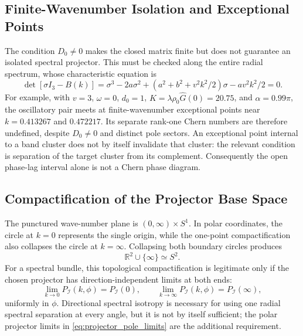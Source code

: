 \documentclass[11pt]{article}
\numberwithin{equation}{section}
\begin{document}
\subsection{Finite-Wavenumber Isolation and Exceptional Points}

The condition $D_0\ne0$ makes the closed matrix finite but does not guarantee
an isolated spectral projector. This must be checked along the entire radial
spectrum, whose characteristic equation is
\begin{equation}
 \det[\sigma I_3-B(k)]
 =\sigma^3-2a\sigma^2+
 (a^2+b^2+v^2k^2/2)\sigma-av^2k^2/2=0.
 \label{eq:radial_characteristic_polynomial}
\end{equation}
For example, with $v=3$, $\omega=0$, $d_0=1$,
$K=\lambda\rho_0\widehat G(0)=20.75$, and $\alpha=0.99\pi$, the oscillatory pair
meets at finite-wavenumber exceptional points near $k=0.413267$ and
$0.472217$. Its separate rank-one Chern numbers are therefore undefined,
despite $D_0\ne0$ and distinct pole sectors. An exceptional point internal
to a band cluster does not by itself invalidate that cluster: the relevant
condition is separation of the target cluster from its complement.
Consequently the open phase-lag interval alone is not a Chern phase diagram.

\subsection{Compactification of the Projector Base Space}

The punctured wave-number plane is $(0,\infty)\times S^1$. In polar
coordinates, the circle at $k=0$ represents the single origin, while the
one-point compactification also collapses the circle at $k=\infty$.
Collapsing both boundary circles produces
\begin{equation}
  \mathbb R^2\cup\{\infty\}\simeq S^2.
  \label{eq:wavenumber_compactification}
\end{equation}
For a spectral bundle, this topological compactification is legitimate
only if the chosen projector has direction-independent limits at both
ends:
\begin{equation}
  \lim_{k\to0}P_{\mathcal I}(k,\phi)=P_{\mathcal I}(0),
  \qquad
  \lim_{k\to\infty}P_{\mathcal I}(k,\phi)=P_{\mathcal I}(\infty),
  \label{eq:projector_pole_limits}
\end{equation}
uniformly in $\phi$. Directional spectral isotropy is necessary for using
one radial spectral separation at every angle, but it is not by itself
sufficient; the polar projector limits in
\eqref{eq:projector_pole_limits} are the additional requirement.
\end{document}
